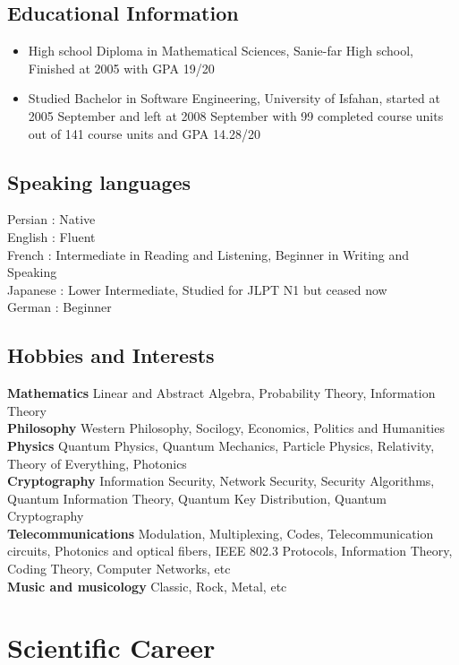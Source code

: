 \documentclass[12pt,a4paper]{article}
\begin{document}
	\subsection{Educational Information}
		\begin{itemize}
		\item High school Diploma in Mathematical Sciences, Sanie-far High school, Finished at 2005 with GPA 19/20
		\item Studied Bachelor in Software Engineering, University of Isfahan, started at 2005 September and left at 2008 September with 99 completed course units out of 141 course units and GPA 14.28/20
		\end{itemize}
			
	\subsection{Speaking languages} 
		Persian : Native \\
		English : Fluent \\
		French : Intermediate in Reading and Listening, Beginner in Writing and Speaking \\
		Japanese : Lower Intermediate, Studied for JLPT N1 but ceased now \\
		German : Beginner 
			 
	\subsection{Hobbies and Interests} 
		\textbf{Mathematics} Linear and Abstract Algebra, Probability Theory, Information Theory \\
		\textbf{Philosophy} Western Philosophy, Socilogy, Economics, Politics and Humanities \\
	    \textbf{Physics} Quantum Physics, Quantum Mechanics, Particle Physics, Relativity, Theory of Everything, Photonics \\
	    \textbf{Cryptography} Information Security, Network Security, Security Algorithms, Quantum Information Theory, Quantum Key Distribution, Quantum Cryptography \\
	    \textbf{Telecommunications} Modulation, Multiplexing, Codes, Telecommunication circuits, Photonics and optical fibers, IEEE 802.3 Protocols, Information Theory, Coding Theory, Computer Networks, etc \\ 
		\textbf{Music and musicology} Classic, Rock, Metal, etc
	 
\section{Scientific Career}
\end{document}
